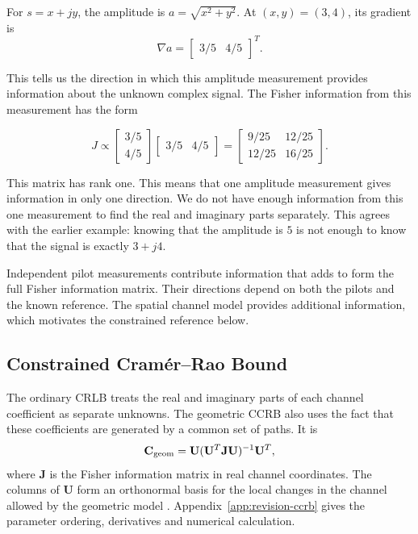 \documentclass[journal]{IEEEtran}
\begin{document}
For $s=x+jy$, the amplitude is $a=\sqrt{x^2+y^2}$. At $(x,y)=(3,4)$,
its gradient is
\begin{equation}
\nabla a=\begin{bmatrix}3/5 & 4/5\end{bmatrix}^{T}.
\end{equation}

This tells us the direction in which this amplitude measurement provides
information about the unknown complex signal. The Fisher information from
this measurement has the form

\begin{equation}
J
\propto
\begin{bmatrix}
3/5\\
4/5
\end{bmatrix}
\begin{bmatrix}
3/5 & 4/5
\end{bmatrix}
=
\begin{bmatrix}
9/25 & 12/25\\
12/25 & 16/25
\end{bmatrix}.
\end{equation}

This matrix has rank one. This means that one amplitude measurement gives
information in only one direction. We do not have enough information from
this one measurement to find the real and imaginary parts separately. This
agrees with the earlier example: knowing that the amplitude is $5$ is not
enough to know that the signal is exactly $3+j4$.

Independent pilot measurements contribute information that adds to form
the full Fisher information matrix. Their directions depend on both the
pilots and the known reference. The spatial channel model provides
additional information, which motivates the constrained reference below.

\subsection{Constrained Cram\'er--Rao Bound}
\label{sec:revised-ccrb}

The ordinary CRLB treats the real and imaginary parts of each channel
coefficient as separate unknowns. The geometric CCRB also uses the fact
that these coefficients are generated by a common set of paths. It is
\begin{equation}
\mathbf C_{\rm geom}
=\mathbf U(\mathbf U^T\mathbf J\mathbf U)^{-1}\mathbf U^T,
\label{eq:revision-ccrb}
\end{equation}
where $\mathbf J$ is the Fisher information matrix in real channel
coordinates. The columns of $\mathbf U$ form an orthonormal basis for the
local changes in the channel allowed by the geometric model
\cite{gorman1990,stoica1998}. Appendix~\ref{app:revision-ccrb} gives the
parameter ordering, derivatives and numerical calculation.
\end{document}
